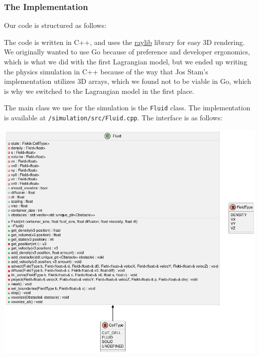 \documentclass[a4paper,12pt]{article}
\begin{document}
\subsubsection{The Implementation}
Our code is structured as follows:

The code is written in C++, and uses the \hyperlink{https://www.raylib.com/}{raylib}
library for easy 3D rendering.
We originally wanted to use Go because of preference and developer ergonomics,
which is what we did with the first Lagrangian model, but we ended up writing
the physics simulation in C++ because of the way that Jos Stam's implementation
utilizes 3D arrays, which we found not to be viable in Go, which is why we
switched to the Lagrangian model in the first place.

The main class we use for the simulation is the \verb|Fluid| class. The implementation
is available at \verb|/simulation/src/Fluid.cpp|. The interface is as follows: \\
\begin{center}
	\includegraphics[width=\textwidth]{resources/Fluid.png}
\end{center}
\end{document}
